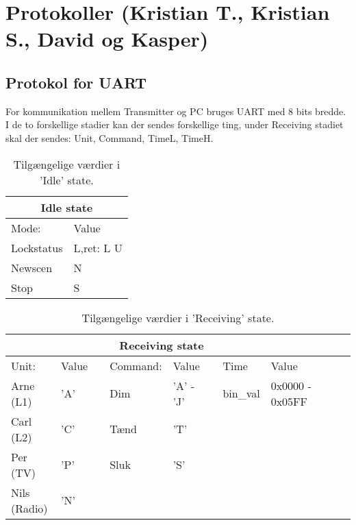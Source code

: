 \section{Protokoller (Kristian T., Kristian S., David og Kasper)}

\subsection{Protokol for UART}\label{prot_UART}

For kommunikation mellem Transmitter og PC bruges UART med 8 bits bredde. I de to forskellige stadier kan der sendes forskellige ting, under Receiving stadiet skal der sendes: Unit, Command, TimeL, TimeH.

\begin{table} [h]
\centering
\begin{tabular}{|l |l |} \hline 
\multicolumn{2}{|c|}{\textbf{Idle state}} \\ \hline
Mode:      & Value \\ \hline
Lockstatus & L,ret: L\/ U \\
Newscen    & N            \\		 
Stop       & S            \\
\hline
\end{tabular}
\caption{Tilgængelige værdier i 'Idle' state.}
\end{table}

\begin{table} [h]
\centering
\begin{tabular}{|l |l |l | l | l | l| l| l| l|l|l|} \hline
\multicolumn{8}{|c|}{\textbf{Receiving state}} \\ \hline
Unit: & Value && Command: & Value  && Time &  Value       \\ \cline{1-2} \cline{4-5} \cline{7-8}
Arne (L1)     & 'A' && Dim  & 'A' - 'J' &&  bin\_val & 0x0000 - 0x05FF  \\  \cline{7-8} %
Carl (L2)     & 'C' && Tænd & 'T'    \\	 %
Per (TV)      & 'P' && Sluk & 'S' & \multicolumn{3}{l}{ } \\ \cline{4-5} %
Nils (Radio)  & 'N' & \multicolumn{6}{l}{ } \\ \cline{1-2}  %
\end{tabular}
\caption{Tilgængelige værdier i 'Receiving' state.}
\end{table}

